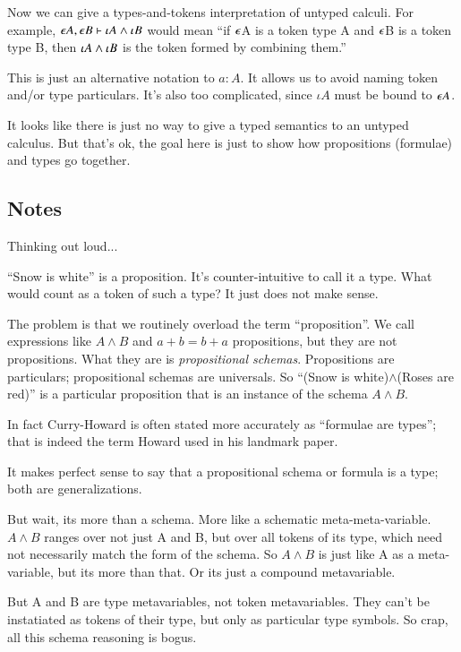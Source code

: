 \documentclass{article}
\begin{document}
Now we can give a types-and-tokens interpretation of untyped calculi.
For example, \(\epsilon A, \epsilon B\vdash \iota A\land \iota B\) would
mean ``if \(\epsilon\)A is a token type A and \(\epsilon\)B is a token
type B, then \(\iota A \land\iota B\) is the token formed by
combining them.''

This is just an alternative notation to \(a:A\). It allows us to avoid
naming token and/or type particulars. It's also too complicated, since
\(\iota A\) must be bound to \(\epsilon A\).

It looks like there is just no way to give a typed semantics to an
untyped calculus. But that's ok, the goal here is just to show how
propositions (formulae) and types go together.


\subsection{Notes}

Thinking out loud...

``Snow is white'' is a proposition. It's counter-intuitive to call it
a type. What would count as a token of such a type? It just does not
make sense.

The problem is that we routinely overload the term ``proposition''. We
call expressions like \(A\land B\) and \(a+b=b+a\) propositions, but
they are not propositions. What they are is \textit{propositional
  schemas}. Propositions are particulars; propositional schemas are
universals. So ``(Snow is white)\(\land\)(Roses are red)'' is a
particular proposition that is an instance of the schema \(A\land B\).

In fact Curry-Howard is often stated more accurately as ``formulae are
types''; that is indeed the term Howard used in his landmark paper.

It makes perfect sense to say that a propositional schema or formula
is a type; both are generalizations.

But wait, its more than a schema. More like a schematic
meta-meta-variable. \(A\land B\) ranges over not just A and B, but
over all tokens of its type, which need not necessarily match the form
of the schema. So \(A\land B\) is just like A as a meta-variable, but
its more than that.  Or its just a compound metavariable.

But A and B are type metavariables, not token metavariables. They
can't be instatiated as tokens of their type, but only as particular
type symbols. So crap, all this schema reasoning is bogus.
\end{document}
